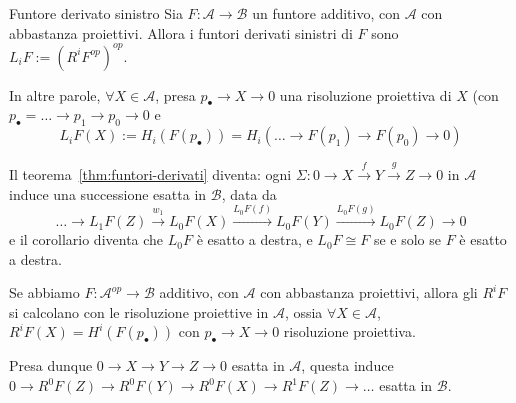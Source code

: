 \begin{definition}{Funtore derivato sinistro}
    Sia \(F : \mathcal{A} \to \mathcal{B}\) un funtore additivo, con
    \(\mathcal{A}\) con abbastanza proiettivi. Allora i funtori derivati
    sinistri di \(F\) sono 
    \(
        L_{i}F := {(R^{i}F^{op})}^{op}
    \).

    In altre parole, \(\forall X \in \mathcal{A}\), presa \(p_\bullet \to X \to
    0\) una risoluzione proiettiva di \(X\) (con \(p_\bullet = \dots \to p_{1}
    \to p_{0} \to 0\) e 
    \[
      L_{i}F{(X)} := H_{i}{(F{(p_\bullet)})} = H_{i}{(\dots \to F{(p_{1})} \to
      F{(p_{0})} \to 0)}
    \]
\end{definition}

Il teorema~\ref{thm:funtori-derivati} diventa: ogni \(\Sigma : 0 \to X
\overset{f}{\to} Y \overset{g}{\to} Z \to 0\) in \(\mathcal{A}\) induce una
successione esatta in \(\mathcal{B}\), data da
\[
  \dots \to L_{1}F{(Z)} \overset{w_{1}}{\to} L_{0}F{(X)}
  \overset{L_{0}F{(f)}}{\to} L_{0}F{(Y)} \overset{L_{0}F{(g)}}{\to} L_{0}F{(Z)}
  \to 0
\]
e il corollario diventa che \(L_0 F\) è esatto a destra, e \(L_0 F \cong
F\) se e solo se \(F\) è esatto a destra.

\begin{remark}{}
    Se abbiamo \(F : \mathcal{A}^{op} \to \mathcal{B}\) additivo, con
    \(\mathcal{A}\) con abbastanza proiettivi, allora gli \(R^{i}F\) si
    calcolano con le risoluzione proiettive in \(\mathcal{A}\), ossia \(\forall
    X \in \mathcal{A}\), \(R^{i}F{(X)} = H^{i}{(F{(p_\bullet)})}\) con
    \(p_\bullet \to X \to 0\) risoluzione proiettiva.

    Presa dunque \(0 \to X \to Y \to Z \to 0\) esatta in \(\mathcal{A}\), questa
    induce \(0 \to R^{0}F{(Z)} \to R^{0}F{(Y)} \to R^{0}F{(X)} \to R^{1}F{(Z)}
    \to \dots\) esatta in \(\mathcal{B}\).
\end{remark}


